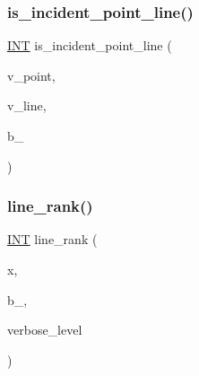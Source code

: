 \mbox{\label{hamming_8_c_afc1071b86a3baa5127e465f450f21d54}} 
\subsubsection{\texorpdfstring{is\+\_\+incident\+\_\+point\+\_\+line()}{is\_incident\_point\_line()}}
{\footnotesize\ttfamily \mbox{\hyperlink{galois_8h_a09fddde158a3a20bd2dcadb609de11dc}{I\+NT}} is\+\_\+incident\+\_\+point\+\_\+line (\begin{DoxyParamCaption}\item[{\mbox{\hyperlink{galois_8h_a09fddde158a3a20bd2dcadb609de11dc}{I\+NT}} $\ast$}]{v\+\_\+point,  }\item[{\mbox{\hyperlink{galois_8h_a09fddde158a3a20bd2dcadb609de11dc}{I\+NT}} $\ast$}]{v\+\_\+line,  }\item[{\mbox{\hyperlink{galois_8h_a09fddde158a3a20bd2dcadb609de11dc}{I\+NT}}}]{b\+\_ }\end{DoxyParamCaption})}

\mbox{\label{hamming_8_c_a43afe3532246cd80d7266ade573e644a}} 
\subsubsection{\texorpdfstring{line\+\_\+rank()}{line\_rank()}}
{\footnotesize\ttfamily \mbox{\hyperlink{galois_8h_a09fddde158a3a20bd2dcadb609de11dc}{I\+NT}} line\+\_\+rank (\begin{DoxyParamCaption}\item[{\mbox{\hyperlink{galois_8h_a09fddde158a3a20bd2dcadb609de11dc}{I\+NT}} $\ast$}]{x,  }\item[{\mbox{\hyperlink{galois_8h_a09fddde158a3a20bd2dcadb609de11dc}{I\+NT}}}]{b\+\_,  }\item[{\mbox{\hyperlink{galois_8h_a09fddde158a3a20bd2dcadb609de11dc}{I\+NT}}}]{verbose\+\_\+level }\end{DoxyParamCaption})}

\mbox{\label{hamming_8_c_a41c3e29e7c7fe4fb5416200d4f81a494}} 
